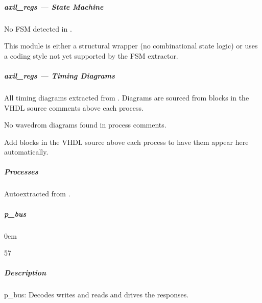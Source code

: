 \documentclass[letterpaper,10pt,english]{sphinxmanual}
\begin{document}
\sphinxstepscope


\subparagraph{axil\_regs — State Machine}
\label{\detokenize{modules/axil_regs/fsm:axil-regs-state-machine}}\label{\detokenize{modules/axil_regs/fsm::doc}}
\sphinxAtStartPar
No FSM detected in .

\sphinxAtStartPar
This module is either a structural wrapper (no combinational
state logic) or uses a coding style not yet supported by the
FSM extractor.

\sphinxstepscope


\subparagraph{axil\_regs — Timing Diagrams}
\label{\detokenize{modules/axil_regs/timing:axil-regs-timing-diagrams}}\label{\detokenize{modules/axil_regs/timing::doc}}
\sphinxAtStartPar
All timing diagrams extracted from .
Diagrams are sourced from  blocks in the VHDL
source comments above each process.

\sphinxAtStartPar
No wavedrom diagrams found in process comments.

\sphinxAtStartPar
Add  blocks in the VHDL source above each
process to have them appear here automatically.

\sphinxstepscope


\subparagraph{Processes}
\label{\detokenize{modules/axil_regs/processes/index:processes}}\label{\detokenize{modules/axil_regs/processes/index::doc}}
\sphinxAtStartPar
Auto\sphinxhyphen{}extracted from .

\sphinxstepscope


\subparagraph{p\_bus}
\label{\detokenize{modules/axil_regs/processes/p_bus:p-bus}}\label{\detokenize{modules/axil_regs/processes/p_bus::doc}}
\begin{DUlineblock}{0em}
\item[]  
\item[]  57
\item[]  
\item[]  
\end{DUlineblock}


\subparagraph{Description}
\label{\detokenize{modules/axil_regs/processes/p_bus:description}}
\sphinxAtStartPar
p\_bus: Decodes writes and reads and drives the responses.
\end{document}
